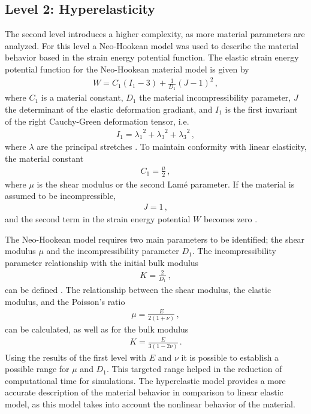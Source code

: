 \subsection{Level 2: Hyperelasticity}
The second level introduces a higher complexity, as more material parameters are analyzed. For this level a 
Neo-Hookean model was used to describe the material behavior based in the strain energy potential function.
The elastic strain energy potential function for the Neo-Hookean material model is given by
\begin{align}
            W = C_1 (I_1 - 3) + \frac{1}{D_1} (J-1)^2 \, ,
\end{align}
where $C_1$ is a material constant, $D_1$ the material incompressibility parameter, $J$ the determinant 
of the elastic deformation gradiant, and $I_1$ is the first invariant of the right Cauchy-Green deformation tensor, i.e. 
\begin{align*}
    I_1 = {\lambda_1}^2 + {\lambda_3}^2 + {\lambda_3}^2 \, ,
\end{align*} 
where $\lambda$ are the principal stretches \cite{Ogden2013}. To maintain conformity with linear elasticity, the material constant 
\begin{align}
    C_1 = \frac{\mu}{2} \, ,
\end{align}
where $\mu$ is the shear modulus or the second Lamé parameter. If the material is assumed to be incompressible,
\begin{align*}
    J = 1 \, ,
\end{align*} 
and the second term in the strain energy potential $W$ becomes zero \cite{Pence2015}. 

The Neo-Hookean model requires two main parameters to be identified; the shear modulus $\mu$ and 
the incompressibility parameter $D_1$. The incompressibility parameter relationship with the initial bulk modulus
\begin{align}
    K = \frac{2}{D_1} \, ,
\end{align}
 can be defined \cite{Ansys2010}. The relationship between the shear modulus, the elastic modulus, and the Poisson's ratio
\begin{align}
    \mu = \frac{E}{2(1+\nu)} \, ,
\end{align}
can be calculated, as well as for the bulk modulus 
\begin{align}
    K = \frac{E}{3(1-2\nu)} \, .
\end{align}
Using the results of the first level with $E$ and $\nu$ it is possible to establish a possible range for $\mu$ 
and $D_1$. This targeted range helped in the reduction of computational time for simulations.
The hyperelastic model provides a more accurate description of the material behavior in comparison to linear 
elastic model, as this model takes into account the nonlinear behavior of the material. 

